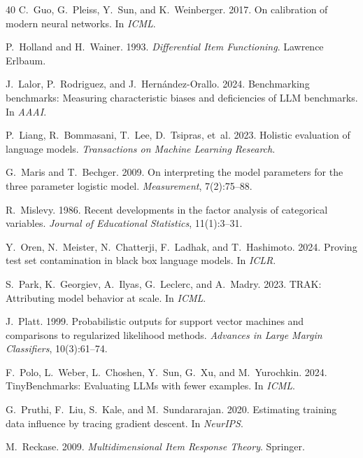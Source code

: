 \documentclass[11pt,a4paper]{article}
\begin{document}
\begin{thebibliography}{40}
C.~Guo, G.~Pleiss, Y.~Sun, and K.~Weinberger. 2017. On calibration of modern neural networks. In \emph{ICML}.

P.~Holland and H.~Wainer. 1993. \emph{Differential Item Functioning}. Lawrence Erlbaum.

J.~Lalor, P.~Rodriguez, and J.~Hern\'{a}ndez-Orallo. 2024. Benchmarking benchmarks: Measuring characteristic biases and deficiencies of LLM benchmarks. In \emph{AAAI}.

P.~Liang, R.~Bommasani, T.~Lee, D.~Tsipras, et~al. 2023. Holistic evaluation of language models. \emph{Transactions on Machine Learning Research}.

G.~Maris and T.~Bechger. 2009. On interpreting the model parameters for the three parameter logistic model. \emph{Measurement}, 7(2):75--88.

R.~Mislevy. 1986. Recent developments in the factor analysis of categorical variables. \emph{Journal of Educational Statistics}, 11(1):3--31.

Y.~Oren, N.~Meister, N.~Chatterji, F.~Ladhak, and T.~Hashimoto. 2024. Proving test set contamination in black box language models. In \emph{ICLR}.

S.~Park, K.~Georgiev, A.~Ilyas, G.~Leclerc, and A.~Madry. 2023. TRAK: Attributing model behavior at scale. In \emph{ICML}.

J.~Platt. 1999. Probabilistic outputs for support vector machines and comparisons to regularized likelihood methods. \emph{Advances in Large Margin Classifiers}, 10(3):61--74.

F.~Polo, L.~Weber, L.~Choshen, Y.~Sun, G.~Xu, and M.~Yurochkin. 2024. TinyBenchmarks: Evaluating LLMs with fewer examples. In \emph{ICML}.

G.~Pruthi, F.~Liu, S.~Kale, and M.~Sundararajan. 2020. Estimating training data influence by tracing gradient descent. In \emph{NeurIPS}.

M.~Reckase. 2009. \emph{Multidimensional Item Response Theory}. Springer.


\end{thebibliography}
\end{document}
